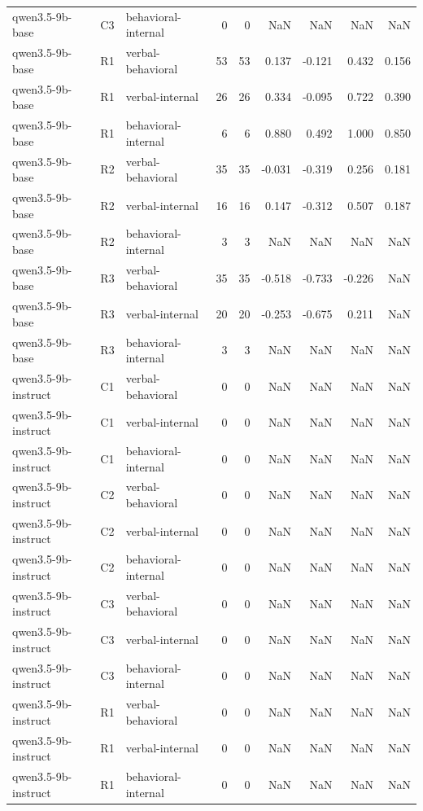 \begin{table}
\begin{tabular}{lllrrrrrr}
qwen3.5-9b-base & C3 & behavioral-internal & 0 & 0 & NaN & NaN & NaN & NaN \\
qwen3.5-9b-base & R1 & verbal-behavioral & 53 & 53 & 0.137 & -0.121 & 0.432 & 0.156 \\
qwen3.5-9b-base & R1 & verbal-internal & 26 & 26 & 0.334 & -0.095 & 0.722 & 0.390 \\
qwen3.5-9b-base & R1 & behavioral-internal & 6 & 6 & 0.880 & 0.492 & 1.000 & 0.850 \\
qwen3.5-9b-base & R2 & verbal-behavioral & 35 & 35 & -0.031 & -0.319 & 0.256 & 0.181 \\
qwen3.5-9b-base & R2 & verbal-internal & 16 & 16 & 0.147 & -0.312 & 0.507 & 0.187 \\
qwen3.5-9b-base & R2 & behavioral-internal & 3 & 3 & NaN & NaN & NaN & NaN \\
qwen3.5-9b-base & R3 & verbal-behavioral & 35 & 35 & -0.518 & -0.733 & -0.226 & NaN \\
qwen3.5-9b-base & R3 & verbal-internal & 20 & 20 & -0.253 & -0.675 & 0.211 & NaN \\
qwen3.5-9b-base & R3 & behavioral-internal & 3 & 3 & NaN & NaN & NaN & NaN \\
qwen3.5-9b-instruct & C1 & verbal-behavioral & 0 & 0 & NaN & NaN & NaN & NaN \\
qwen3.5-9b-instruct & C1 & verbal-internal & 0 & 0 & NaN & NaN & NaN & NaN \\
qwen3.5-9b-instruct & C1 & behavioral-internal & 0 & 0 & NaN & NaN & NaN & NaN \\
qwen3.5-9b-instruct & C2 & verbal-behavioral & 0 & 0 & NaN & NaN & NaN & NaN \\
qwen3.5-9b-instruct & C2 & verbal-internal & 0 & 0 & NaN & NaN & NaN & NaN \\
qwen3.5-9b-instruct & C2 & behavioral-internal & 0 & 0 & NaN & NaN & NaN & NaN \\
qwen3.5-9b-instruct & C3 & verbal-behavioral & 0 & 0 & NaN & NaN & NaN & NaN \\
qwen3.5-9b-instruct & C3 & verbal-internal & 0 & 0 & NaN & NaN & NaN & NaN \\
qwen3.5-9b-instruct & C3 & behavioral-internal & 0 & 0 & NaN & NaN & NaN & NaN \\
qwen3.5-9b-instruct & R1 & verbal-behavioral & 0 & 0 & NaN & NaN & NaN & NaN \\
qwen3.5-9b-instruct & R1 & verbal-internal & 0 & 0 & NaN & NaN & NaN & NaN \\
qwen3.5-9b-instruct & R1 & behavioral-internal & 0 & 0 & NaN & NaN & NaN & NaN \\

\end{tabular}
\end{table}

